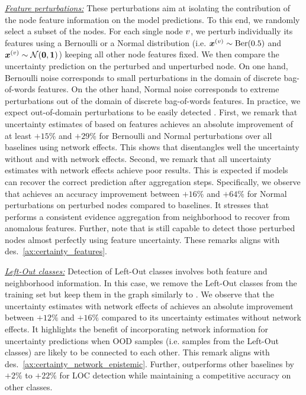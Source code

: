 \textit{\underline{Feature perturbations:}} These perturbations aim at isolating the contribution of the node feature information on the model predictions. To this end, we randomly select a subset of the nodes. For each single node $v$, we perturb individually its features using a Bernoulli or a Normal distribution (i.e. $\bm{x}^{(v)} \sim \operatorname{Ber}(0.5)$ and $\bm{x}^{(v)} \sim \operatorname{\mathcal{N}}(\bm{0}, \bm{1})$) keeping all other node features fixed. We then compare the uncertainty prediction on the perturbed and unperturbed node. On one hand, Bernoulli noise corresponds to small perturbations in the domain of discrete bag-of-words features. On the other hand, Normal noise corresponds to extreme perturbations out of the domain of discrete bag-of-words features. In practice, we expect out-of-domain perturbations to be easily detected \citep{charpentier2020}. First, we remark that uncertainty estimates of \GPNacro{} based on features achieves an absolute improvement of at least $+15\%$ and $+29\%$ for Bernoulli and Normal perturbations over all baselines using network effects. This shows that \GPNacro{} disentangles well the uncertainty without and with network effects. Second, we remark that all uncertainty estimates with network effects achieve poor results. This is expected if models can recover the correct prediction after aggregation steps. Specifically, we observe that \GPNacro{} achieves an accuracy improvement between $+16\%$ and $+64\%$ for Normal perturbations on perturbed nodes compared to baselines. It stresses that \GPNacro{} performs a consistent evidence aggregation from neighborhood to recover from anomalous features. Further, note that \GPNacro{} is still capable to detect those perturbed nodes almost perfectly using feature uncertainty. These remarks aligns with des.~\ref{ax:certainty_features}. 


\textit{\underline{Left-Out classes:}} Detection of Left-Out classes involves both feature and neighborhood information. In this case, we remove the Left-Out classes from the training set but keep them in the graph similarly to \citep{Zhao2020}. We observe that the uncertainty estimates with network effects of \GPNacro{} achieves an absolute improvement between $+12\%$ and $+16\%$ compared to its uncertainty estimates without network effects. It highlights the benefit of incorporating network information for uncertainty predictions when OOD samples (i.e. samples from the Left-Out classes) are likely to be connected to each other. This remark aligns with des.~\ref{ax:certainty_network_epistemic}. Further, \GPNacro{} outperforms other baselines by $+2\%$ to $+22\%$ for LOC detection while maintaining a competitive accuracy on other classes.

